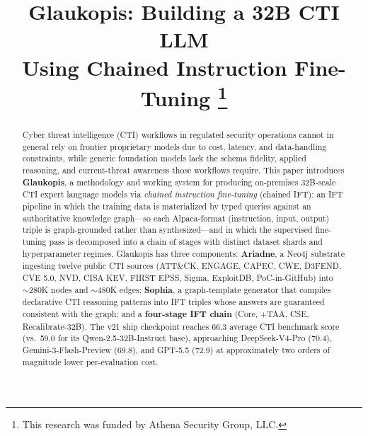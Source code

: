 \documentclass[conference]{IEEEtran}
\begin{document}
\title{Glaukopis: Building a 32B CTI LLM \\
Using Chained Instruction Fine-Tuning
\thanks{This research was funded by Athena Security Group, LLC.}
}

\author{
\and
{}
\and
{}
}

\maketitle

\begin{abstract}
Cyber threat intelligence (CTI) workflows in regulated security operations cannot in general rely on frontier proprietary models due to cost, latency, and data-handling constraints, while generic foundation models lack the schema fidelity, applied reasoning, and current-threat awareness those workflows require. This paper introduces \textbf{Glaukopis}, a methodology and working system for producing on-premises 32B-scale CTI expert language models via \textit{chained instruction fine-tuning} (chained IFT): an IFT pipeline in which the training data is materialized by typed queries against an authoritative knowledge graph---so each Alpaca-format (instruction, input, output) triple is graph-grounded rather than synthesized---and in which the supervised fine-tuning pass is decomposed into a chain of stages with distinct dataset shards and hyperparameter regimes. Glaukopis has three components: \textbf{Ariadne}, a Neo4j substrate ingesting twelve public CTI sources (ATT\&CK, ENGAGE, CAPEC, CWE, D3FEND, CVE 5.0, NVD, CISA KEV, FIRST EPSS, Sigma, ExploitDB, PoC-in-GitHub) into ${\sim}280$K nodes and ${\sim}480$K edges; \textbf{Sophia}, a graph-template generator that compiles declarative CTI reasoning patterns into IFT triples whose answers are guaranteed consistent with the graph; and a \textbf{four-stage IFT chain} (Core, +TAA, CSE, Recalibrate-32B). The v21 ship checkpoint reaches 66.3 average CTI benchmark score (vs.\ 59.0 for its Qwen-2.5-32B-Instruct base), approaching DeepSeek-V4-Pro (70.4), Gemini-3-Flash-Preview (69.8), and GPT-5.5 (72.9) at approximately two orders of magnitude lower per-evaluation cost.
\end{abstract}
\end{document}
